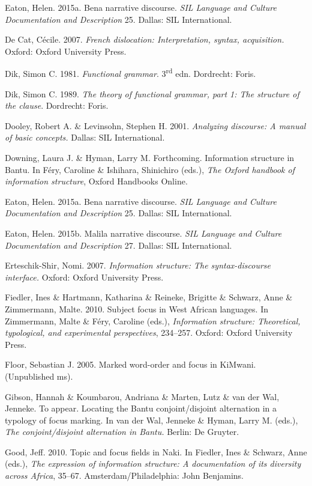 \documentclass[output=paper]{langsci/langscibook}
\begin{document}
\begin{styleLangSciTranslation}
\begin{styleLangSciTranslation}
\begin{styleLangSciTranslation}
Eaton, Helen. 2015a. Bena narrative discourse. \textit{SIL Language and Culture Documentation and Description} 25. Dallas: SIL International.

De Cat, Cécile. 2007. \textit{French dislocation: Interpretation, syntax, acquisition.} Oxford: Oxford University Press.

Dik, Simon C. 1981. \textit{Functional grammar}. 3\textsuperscript{rd} edn. Dordrecht: Foris.

Dik, Simon C. 1989. \textit{The theory of functional grammar, part 1: The structure of the clause}. Dordrecht: Foris.

Dooley, Robert A. \& Levinsohn, Stephen H. 2001. \textit{Analyzing discourse: A manual of basic concepts.} Dallas: SIL International.

Downing, Laura J. \& Hyman, Larry M. Forthcoming. Information structure in Bantu. In Féry, Caroline \& Ishihara, Shinichiro (eds.), \textit{The Oxford handbook of information structure}, Oxford Handbooks Online.

Eaton, Helen. 2015a. Bena narrative discourse. \textit{SIL Language and Culture Documentation and Description} 25. Dallas: SIL International.

Eaton, Helen. 2015b. Malila narrative discourse. \textit{SIL Language and Culture Documentation and Description} 27. Dallas: SIL International.

Erteschik-Shir, Nomi. 2007. \textit{Information structure: The syntax-discourse interface.} Oxford: Oxford University Press.

Fiedler, Ines \& Hartmann, Katharina \& Reineke, Brigitte \& Schwarz, Anne \& Zimmermann, Malte. 2010. Subject focus in West African languages. In Zimmermann, Malte \& Féry, Caroline (eds.), \textit{Information structure: Theoretical, typological, and experimental perspectives}, 234–257. Oxford: Oxford University Press.

Floor, Sebastian J. 2005. Marked word-order and focus in KiMwani. (Unpublished ms).

Gibson, Hannah \& Koumbarou, Andriana \& Marten, Lutz \& van der Wal, Jenneke. To appear. Locating the Bantu conjoint/disjoint alternation in a typology of focus marking. In van der Wal, Jenneke \& Hyman, Larry M. (eds.), \textit{The conjoint/disjoint alternation in Bantu.} Berlin: De Gruyter.

Good, Jeff. 2010. Topic and focus fields in Naki. In Fiedler, Ines \& Schwarz, Anne (eds.), \textit{The expression of information structure: A documentation of its diversity across Africa}, 35–67. Amsterdam/Philadelphia: John Benjamins.


\end{styleLangSciTranslation}
\end{styleLangSciTranslation}
\end{styleLangSciTranslation}
\end{document}
